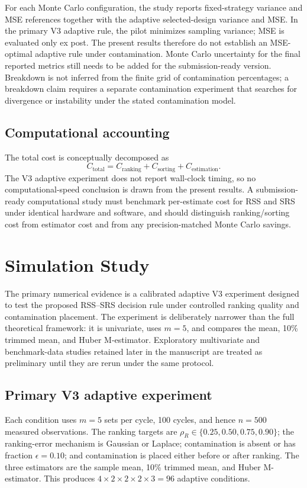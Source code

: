 \documentclass[12pt]{article}
\begin{document}
For each Monte Carlo configuration, the study reports fixed-strategy variance and MSE references together with the adaptive selected-design variance and MSE. In the primary V3 adaptive rule, the pilot minimizes sampling variance; MSE is evaluated only ex post. The present results therefore do not establish an MSE-optimal adaptive rule under contamination. Monte Carlo uncertainty for the final reported metrics still needs to be added for the submission-ready version. Breakdown is not inferred from the finite grid of contamination percentages; a breakdown claim requires a separate contamination experiment that searches for divergence or instability under the stated contamination model.

\subsection{Computational accounting}
The total cost is conceptually decomposed as
\[
C_{\mathrm{total}}=C_{\mathrm{ranking}}+C_{\mathrm{sorting}}+C_{\mathrm{estimation}}.
\]
The V3 adaptive experiment does not report wall-clock timing, so no computational-speed conclusion is drawn from the present results. A submission-ready computational study must benchmark per-estimate cost for RSS and SRS under identical hardware and software, and should distinguish ranking/sorting cost from estimator cost and from any precision-matched Monte Carlo savings.

\section{Simulation Study}
\label{sec:simulation}
The primary numerical evidence is a calibrated adaptive V3 experiment designed to test the proposed RSS--SRS decision rule under controlled ranking quality and contamination placement. The experiment is deliberately narrower than the full theoretical framework: it is univariate, uses $m=5$, and compares the mean, 10\% trimmed mean, and Huber M-estimator. Exploratory multivariate and benchmark-data studies retained later in the manuscript are treated as preliminary until they are rerun under the same protocol.

\subsection{Primary V3 adaptive experiment}
\label{subsec:v3_adaptive}
Each condition uses $m=5$ sets per cycle, 100 cycles, and hence $n=500$ measured observations. The ranking targets are $\rho_R\in\{0.25,0.50,0.75,0.90\}$; the ranking-error mechanism is Gaussian or Laplace; contamination is absent or has fraction $\epsilon=0.10$; and contamination is placed either before or after ranking. The three estimators are the sample mean, 10\% trimmed mean, and Huber M-estimator. This produces $4\times2\times2\times2\times3=96$ adaptive conditions.
\end{document}
